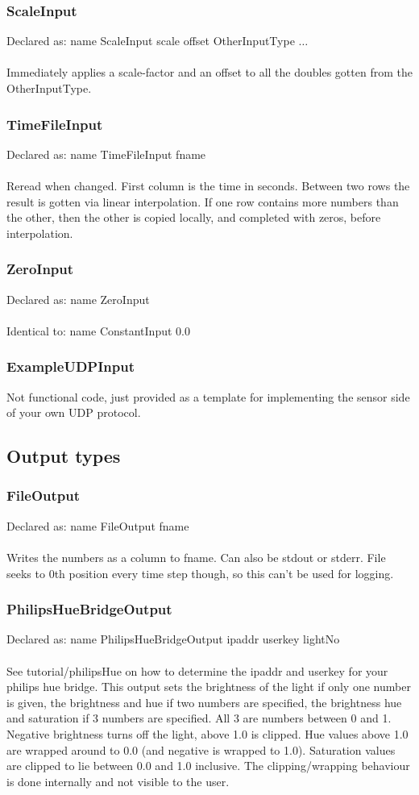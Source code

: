 \documentclass[a4paper]{article}
\begin{document}
\subsubsection{ScaleInput}
Declared as: name ScaleInput scale offset OtherInputType $\ldots$\\\\
Immediately applies a scale-factor and an offset to all the doubles gotten from the OtherInputType.
\subsubsection{TimeFileInput}
Declared as: name TimeFileInput fname\\\\
Reread when changed. First column is the time in seconds. Between two rows the result is gotten via linear interpolation. If one row contains more numbers than the other, then the other is copied locally, and completed with zeros, before interpolation.
\subsubsection{ZeroInput}
Declared as: name ZeroInput\\\\
Identical to: name ConstantInput 0.0
\subsubsection{ExampleUDPInput}
Not functional code, just provided as a template for implementing the sensor side of your own UDP protocol.
\subsection{Output types}
\subsubsection{FileOutput}
Declared as: name FileOutput fname\\\\
Writes the numbers as a column to fname. Can also be stdout or stderr.
File seeks to 0th position every time step though, so this can't be used for logging.
\subsubsection{PhilipsHueBridgeOutput}
Declared as: name PhilipsHueBridgeOutput ipaddr userkey lightNo\\\\
See tutorial/philipsHue on how to determine the ipaddr and userkey for your philips hue bridge.
This output sets the brightness of the light if only one number is given, the brightness and hue if two numbers are specified, the brightness hue and saturation if 3 numbers are specified. All 3 are numbers between 0 and 1. Negative brightness turns off the light, above 1.0 is clipped. Hue values above 1.0 are wrapped around to 0.0 (and negative is wrapped to 1.0). Saturation values are clipped to lie between 0.0 and 1.0 inclusive. The clipping/wrapping behaviour is done internally and not visible to the user.
\end{document}
